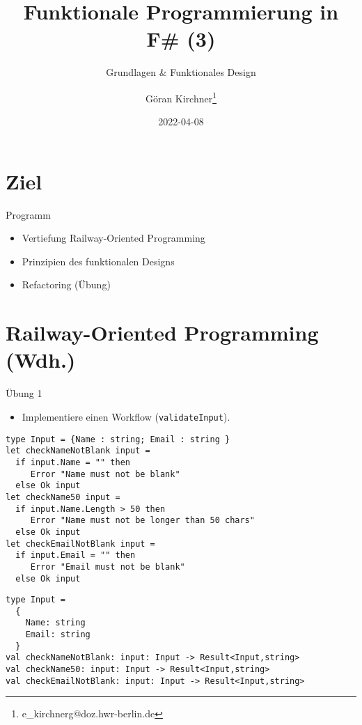\documentclass[t]{beamer}
\author{Göran Kirchner\thanks{e\_kirchnerg@doz.hwr-berlin.de}}
\date{2022-04-08}
\title{Funktionale Programmierung in F\# (3)}
\subtitle{Grundlagen \& Funktionales Design}
\begin{document}
\maketitle

\section{Ziel }
\label{sec:orga24e0f7}

\begin{frame}[label={sec:orgb00a92c}]{Programm}
\begin{itemize}
\item Vertiefung Railway-Oriented Programming
\item Prinzipien des funktionalen Designs
\item Refactoring (Übung)
\end{itemize}
\end{frame}

\section{Railway-Oriented Programming (Wdh.) }
\label{sec:org884c213}

\begin{frame}[label={sec:org3a4f635},fragile]{Übung 1}
 \begin{itemize}
\item Implementiere einen Workflow (\texttt{validateInput}).
\end{itemize}

\begin{verbatim}
type Input = {Name : string; Email : string }
let checkNameNotBlank input =
  if input.Name = "" then
     Error "Name must not be blank"
  else Ok input
let checkName50 input =
  if input.Name.Length > 50 then
     Error "Name must not be longer than 50 chars"
  else Ok input
let checkEmailNotBlank input =
  if input.Email = "" then
     Error "Email must not be blank"
  else Ok input
\end{verbatim}

\begin{verbatim}
type Input =
  {
    Name: string
    Email: string
  }
val checkNameNotBlank: input: Input -> Result<Input,string>
val checkName50: input: Input -> Result<Input,string>
val checkEmailNotBlank: input: Input -> Result<Input,string>
\end{verbatim}
\end{frame}
\end{document}
